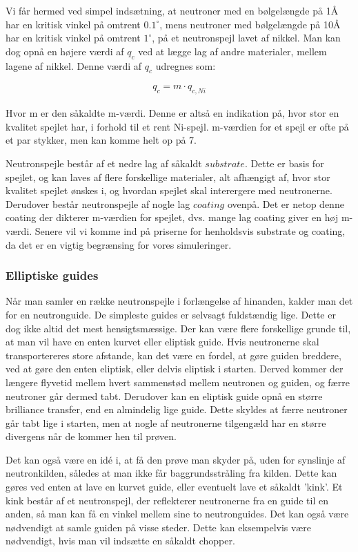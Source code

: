 \documentclass[12pt,oneside,a4paper]{article}
\begin{document}
{{{{{Vi får hermed ved simpel indsætning, at neutroner med en bølgelængde på 1Å har en kritisk vinkel på omtrent $0.1^∘$, mens neutroner med bølgelængde på 10Å har en kritisk vinkel på omtrent $1^∘$, på et neutronspejl lavet af nikkel.
Man kan dog opnå en højere værdi af $q_c$ ved at lægge lag af andre materialer, mellem lagene af nikkel. Denne værdi af $q_c$ udregnes som:

\begin{align}
q_c=m \cdot q_{c,Ni}
\end{align}

Hvor m er den såkaldte m-værdi. Denne er altså en indikation på, hvor stor en kvalitet spejlet har, i forhold til et rent Ni-spejl. m-værdien for et spejl er ofte på et par stykker, men kan komme helt op på 7. \cite{lefmann_arleth_kirkensgaard_lebech_thomsen}

Neutronspejle består af et nedre lag af såkaldt $substrate$. Dette er basis for spejlet, og kan laves af flere forskellige materialer, alt afhængigt af, hvor stor kvalitet spejlet ønskes i, og hvordan spejlet skal interergere med neutronerne. Derudover består neutronspejle af nogle lag $coating$ ovenpå. Det er netop denne coating der dikterer m-værdien for spejlet, dvs. mange lag coating giver en høj m-værdi. Senere vil vi komme ind på priserne for henholdsvis substrate og coating, da det er en vigtig begrænsing for vores simuleringer.

\subsubsection{Elliptiske guides}
Når man samler en række neutronspejle i forlængelse af hinanden, kalder man det for en neutronguide. De simpleste guides er selvsagt fuldstændig lige. Dette er dog ikke altid det mest hensigtsmæssige. Der kan være flere forskellige grunde til, at man vil have en enten kurvet eller eliptisk guide. 
Hvis neutronerne skal transportereres store afstande, kan det være en fordel, at gøre guiden breddere, ved at gøre den enten eliptisk, eller delvis eliptisk i starten. Derved kommer der længere flyvetid mellem hvert sammenstød mellem neutronen og guiden, og færre neutroner går dermed tabt. 
Derudover kan en eliptisk guide opnå en større brilliance transfer, end en almindelig lige guide. Dette skyldes at færre neutroner går tabt lige  i starten, men at nogle af neutronerne tilgengæld har en større divergens når de kommer hen til prøven. 

Det kan også være en idé i, at få den prøve man skyder på, uden for synslinje af neutronkilden, således at man ikke får baggrundsstråling fra kilden. Dette kan gøres ved enten at lave en kurvet guide, eller eventuelt lave et såkaldt 'kink'. Et kink består af et neutronspejl, der reflekterer neutronerne fra en guide til en anden, så man kan få en vinkel mellem sine to neutronguides. 
Det kan også være nødvendigt at samle guiden på visse steder. Dette kan eksempelvis være nødvendigt, hvis man vil indsætte en såkaldt chopper.

}}}}}
\end{document}
